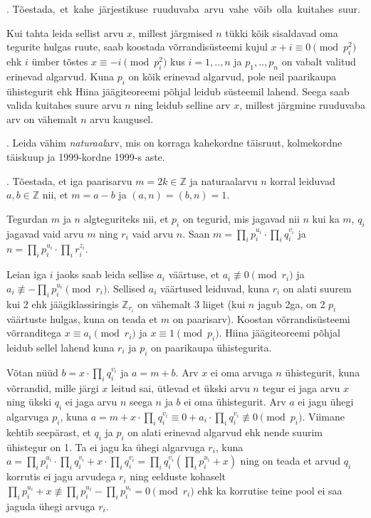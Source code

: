 \documentclass[a4paper, 10pt]{article}
\newcommand{\Z}{\mathbb{Z}}
\begin{document}
. \mbox{Tõestada, et kahe järjestikuse ruuduvaba arvu vahe võib olla kuitahes suur.}

\bigskip
Kui tahta leida sellist arvu $x$, millest järgmised $n$ tükki kõik sisaldavad oma tegurite hulgas ruute, saab koostada võrrandisüsteemi kujul $x+i\equiv 0\pmod {p_i^2}$ ehk $i$ ümber tõstes $x\equiv -i\pmod {p_i^2}$ kus $i=1,..,n$ ja $p_1,..,p_n$ on vabalt valitud erinevad algarvud. Kuna $p_i$ on kõik erinevad algarvud, pole neil paarikaupa ühistegurit ehk Hiina jäägiteoreemi põhjal leidub süsteemil lahend. Seega saab valida kuitahes suure arvu $n$ ning leidub selline arv $x$, millest järgmine ruuduvaba arv on vähemalt $n$ arvu kaugusel.
\bigskip

. Leida vähim \emph{naturaal}arv, mis on korraga kahekordne täisruut, kolmekordne täiskuup ja 1999-kordne 1999-s aste. 

\bigskip

. Tõestada, et iga paarisarvu $m=2k\in\Z$ ja naturaalarvu $n$ korral leiduvad $a,b\in\Z$ nii, et $m=a-b$ ja $(a,n) = (b,n) = 1$. 

\bigskip
Tegurdan $m$ ja $n$ algteguriteks nii, et $p_i$ on tegurid, mis jagavad nii $n$ kui ka $m$, $q_i$ jagavad vaid arvu $m$ ning $r_i$ vaid arvu $n$. Saan $m=\prod_ip_i^{u_i}\cdot\prod_iq_i^{v_i}$ ja $n=\prod_ip_i^{u_i}\cdot\prod_ir_i^{z_i}$. 

Leian iga $i$ jaoks saab leida sellise $a_i$ väärtuse, et $a_i\not\equiv0\pmod{r_i}$ ja $a_i\not\equiv-\prod_ip_i^{u_i}\pmod{r_i}$. Sellised $a_i$ väärtused leiduvad, kuna $r_i$ on alati suurem kui 2 ehk jäägiklassiringis $\Z_{r_i}$ on vähemalt 3 liiget (kui $n$ jagub 2ga, on 2 $p_i$ väärtuste hulgas, kuna on teada et $m$ on paarisarv). Koostan võrrandisüsteemi võrranditega $x\equiv a_i\pmod{r_i}$ ja $x\equiv1\pmod{p_i}$. Hiina jäägiteoreemi põhjal leidub sellel lahend kuna $r_i$ ja $p_i$ on paarikaupa ühistegurita.

Võtan nüüd $b=x\cdot\prod_iq_i^{v_i}$ ja $a=m+b$. Arv $x$ ei oma arvuga $n$ ühistegurit, kuna võrrandid, mille järgi $x$ leitud sai, ütlevad et ükski arvu $n$ tegur ei jaga arvu $x$ ning ükski $q_i$ ei jaga arvu $n$ seega $n$ ja $b$ ei oma ühistegurit. Arv $a$ ei jagu ühegi algarvuga $p_i$, kuna $a= m+x\cdot\prod_iq_i^{v_i}\equiv 0+a_i\cdot\prod_iq_i^{v_i}\not\equiv0\pmod{p_i}$. Viimane kehtib seepärast, et $q_i$ ja $p_i$ on alati erinevad algarvud ehk nende suurim ühistegur on 1. Ta ei jagu ka ühegi algarvuga $r_i$, kuna $a=\prod_ip_i^{u_i}\cdot\prod_iq_i^{v_i}+x\cdot\prod_iq_i^{v_i}=\prod_iq_i^{v_i}(\prod_ip_i^{u_i}+x)$ ning on teada et arvud $q_i$ korrutis ei jagu arvudega $r_i$ ning eelduste kohaselt $\prod_ip_i^{u_i}+x\not\equiv\prod_ip_i^{u_i}-\prod_ip_i^{u_i}=0\pmod{r_i}$ ehk ka korrutise teine pool ei saa jaguda ühegi arvuga $r_i$.
\end{document}
